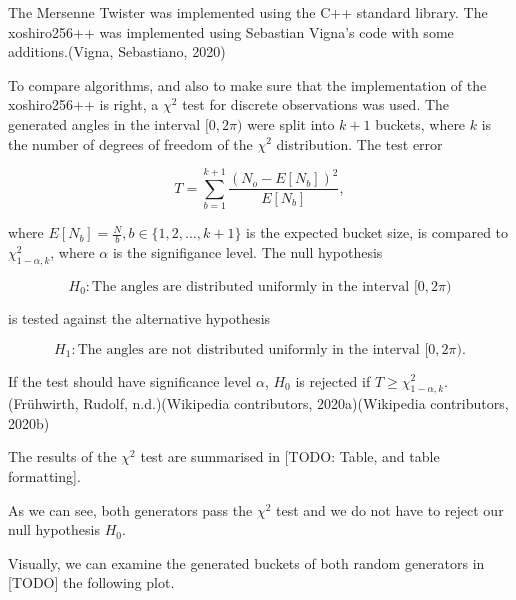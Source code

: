 \documentclass[
]{article}
\begin{document}
The Mersenne Twister was implemented using the C++ standard library. The
xoshiro256++ was implemented using Sebastian Vigna's code with some
additions.(Vigna, Sebastiano, 2020)

To compare algorithms, and also to make sure that the implementation of
the xoshiro256++ is right, a \(\chi^2\) test for discrete observations
was used. The generated angles in the interval \([0, 2\pi)\) were split
into \(k+1\) buckets, where \(k\) is the number of degrees of freedom of
the \(\chi^2\) distribution. The test error

\begin{equation}
T = \sum_{b=1}^{k+1}{\frac{(N_o - E[N_b])^2}{E[N_b]}},
\end{equation}

where \(E[N_b] = \frac{N}{b}, b \in \{1, 2, \dots , k+1\}\) is the
expected bucket size, is compared to \(\chi^2_{1-\alpha, k}\), where
\(\alpha\) is the signifigance level. The null hypothesis

\[
H_0: \textrm{The angles are distributed uniformly in the interval } [0, 2 \pi)
\]

is tested against the alternative hypothesis

\[
H_1: \textrm{The angles are not distributed uniformly in the interval } [0, 2 \pi) \textrm{.}
\]

If the test should have significance level \(\alpha\), \(H_0\) is
rejected if \(T \ge \chi^2_{1-\alpha, k}\).(Frühwirth, Rudolf,
n.d.)(Wikipedia contributors, 2020a)(Wikipedia contributors, 2020b)

The results of the \(\chi^2\) test are summarised in {[}TODO: Table, and
table formatting{]}.

As we can see, both generators pass the \(\chi^2\) test and we do not
have to reject our null hypothesis \(H_0\).

Visually, we can examine the generated buckets of both random generators
in {[}TODO{]} the following plot.
\end{document}
